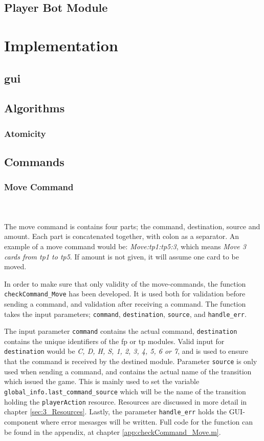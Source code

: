 \documentclass[runningheads,a4paper]{llncs}
\begin{document}
\subsection{Player Bot Module}


\section{Implementation}
\label{sec:3_implementation}
\subsection{\ac{gui}}
\label{sec:3_gui}
\subsection{Algorithms}
\subsubsection{Atomicity}
\subsection{Commands}
\subsubsection{Move Command}~\\~\\
\label{sec:3_move_command}
The move command is contains four parts; the command, destination, source and amount. Each part is concatenated together, with colon as a separator. An example of a move command would be: \textit{Move:\ac{tp}1:\ac{tp}5:3}, which means \textit{Move 3 cards from \ac{tp}1 to \ac{tp}5}. If amount is not given, it will assume one card to be moved.
\newline

In order to make sure that only validity of the move-commands, the function \verb!checkCommand_Move! has been developed. It is used both for validation before sending a command, and validation after receiving a command. The function takes the input parameters; \verb!command!, \verb!destination!, \verb!source!, and \verb!handle_err!. 
\newline

The input parameter \verb!command! contains the actual command, \verb!destination! contains the unique identifiers of the \ac{fp} or \ac{tp} modules. Valid input for \verb!destination! would be \textit{C, D, H, S, 1, 2, 3, 4, 5, 6 or 7}, and is used to ensure that the command is received by the destined module. Parameter \verb!source! is only used when sending a command, and contains the actual name of the transition which issued the game. This is mainly used to set the variable \verb!global_info.last_command_source! which will be the name of the transition holding the \verb!playerAction! resource. Resources are discussed in more detail in chapter \ref{sec:3_Resources}. Lastly, the parameter \verb!handle_err! holds the GUI-component where error mesasges will be written. Full code for the function can be found in the appendix, at chapter \ref{app:checkCommand_Move.m}.
\end{document}
